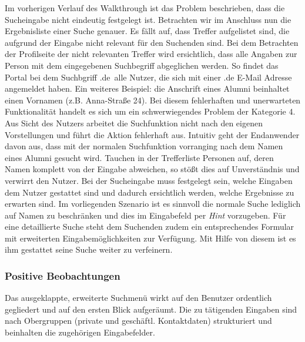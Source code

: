 {
	Im vorherigen Verlauf des Walkthrough ist das Problem beschrieben, dass die Sucheingabe nicht eindeutig festgelegt ist. Betrachten wir im Anschluss nun die Ergebnisliste einer Suche genauer. Es fällt auf, dass Treffer aufgelistet sind, die aufgrund der Eingabe nicht relevant für den Suchenden sind. Bei dem Betrachten der Profilseite der nicht relevanten Treffer wird ersichtlich, dass alle Angaben zur Person mit dem eingegebenen Suchbegriff abgeglichen werden. So findet das Portal bei dem Suchbgriff \glqq .de\grqq ~alle Nutzer, die sich mit einer .de E-Mail Adresse angemeldet haben. Ein weiteres Beispiel: die Anschrift eines Alumni beinhaltet einen Vornamen (z.B. Anna-Straße 24).
}
{
	Bei diesem fehlerhaften und unerwarteten Funktionalität handelt es sich um ein schwerwiegendes Problem der Kategorie 4. Aus Sicht des Nutzers arbeitet die Suchfunktion nicht nach den eigenen Vorstellungen und führt die Aktion fehlerhaft aus. Intuitiv geht der Endanwender davon aus, dass mit der normalen Suchfunktion vorranging nach dem Namen eines Alumni gesucht wird. Tauchen in der Trefferliste Personen auf, deren Namen komplett von der Eingabe abweichen, so stößt dies auf Unverständnis und verwirrt den Nutzer.
}
{
	Bei der Sucheingabe muss festgelegt sein, welche Eingaben dem Nutzer gestattet sind und dadurch ersichtlich werden, welche Ergebnisse zu erwarten sind. Im vorliegenden Szenario ist es sinnvoll die normale Suche lediglich auf Namen zu beschränken und dies im Eingabefeld per \emph{Hint} vorzugeben. Für eine detaillierte Suche steht dem Suchenden zudem ein entsprechendes Formular mit erweiterten Eingabemöglichkeiten zur Verfügung. Mit Hilfe von diesem ist es ihm gestattet seine Suche weiter zu verfeinern.
} 


\subsubsection*{Positive Beobachtungen}
Das ausgeklappte, erweiterte Suchmenü wirkt auf den Benutzer ordentlich gegliedert und auf den ersten Blick aufgeräumt. Die zu tätigenden Eingaben sind nach Obergruppen (private und geschäftl. Kontaktdaten) strukturiert und beinhalten die zugehörigen Eingabefelder.

